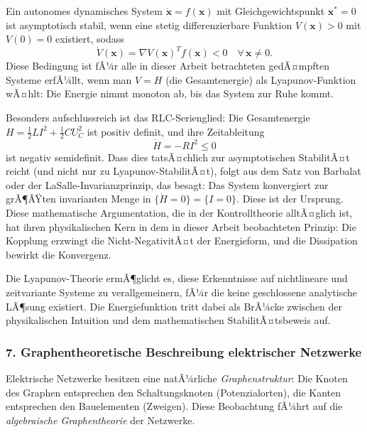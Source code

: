 ﻿\documentclass[12pt, a4paper]{article}
\begin{document}
	Ein autonomes dynamisches System $\dot{\mathbf{x}} = f(\mathbf{x})$ mit Gleichgewichtspunkt $\mathbf{x}^* = 0$ ist asymptotisch stabil, wenn eine stetig differenzierbare Funktion $V(\mathbf{x}) > 0$ mit $V(0) = 0$ existiert, sodass
	\begin{equation}
		\dot{V}(\mathbf{x}) = \nabla V(\mathbf{x})^T f(\mathbf{x}) < 0 \quad \forall\, \mathbf{x} \neq 0.
	\end{equation}
	Diese Bedingung ist fÃ¼r alle in dieser Arbeit betrachteten gedÃ¤mpften Systeme erfÃ¼llt, wenn man $V = H$ (die Gesamtenergie) als Lyapunov-Funktion wÃ¤hlt: Die Energie nimmt monoton ab, bis das System zur Ruhe kommt.

	Besonders aufschlussreich ist das RLC-Serienglied: Die Gesamtenergie $H = \frac{1}{2}LI^2 + \frac{1}{2}CU_C^2$ ist positiv definit, und ihre Zeitableitung
	\begin{equation}
		\dot{H} = -R I^2 \leq 0
	\end{equation}
	ist negativ semidefinit. Dass dies tatsÃ¤chlich zur asymptotischen StabilitÃ¤t reicht (und nicht nur zu Lya\-punov-StabilitÃ¤t), folgt aus dem Satz von Barbalat oder der LaSalle-Invarianzprinzip, das besagt: Das System konvergiert zur grÃ¶ÃŸten invarianten Menge in $\{\dot{H} = 0\} = \{I = 0\}$. Diese ist der Ursprung. Diese mathematische Argumentation, die in der Kontrolltheorie alltÃ¤glich ist, hat ihren physikalischen Kern in dem in dieser Arbeit beobachteten Prinzip: Die Kopplung erzwingt die Nicht-NegativitÃ¤t der Energieform, und die Dissipation bewirkt die Konvergenz.

	Die Lyapunov-Theorie ermÃ¶glicht es, diese Erkenntnisse auf nichtlineare und zeitvariante Systeme zu verallgemeinern, fÃ¼r die keine geschlossene analytische LÃ¶sung existiert. Die Energiefunktion tritt dabei als BrÃ¼cke zwischen der physikalischen Intuition und dem mathematischen StabilitÃ¤tsbeweis auf.

	\subsubsection*{7. \quad Graphentheoretische Beschreibung elektrischer Netzwerke}

	Elektrische Netzwerke besitzen eine natÃ¼rliche \textit{Graphenstruktur}: Die Knoten des Graphen entsprechen den Schaltungsknoten (Potenzialorten), die Kanten entsprechen den Bauelementen (Zweigen). Diese Beobachtung fÃ¼hrt auf die \textit{algebraische Graphentheorie} der Netzwerke.
\end{document}
